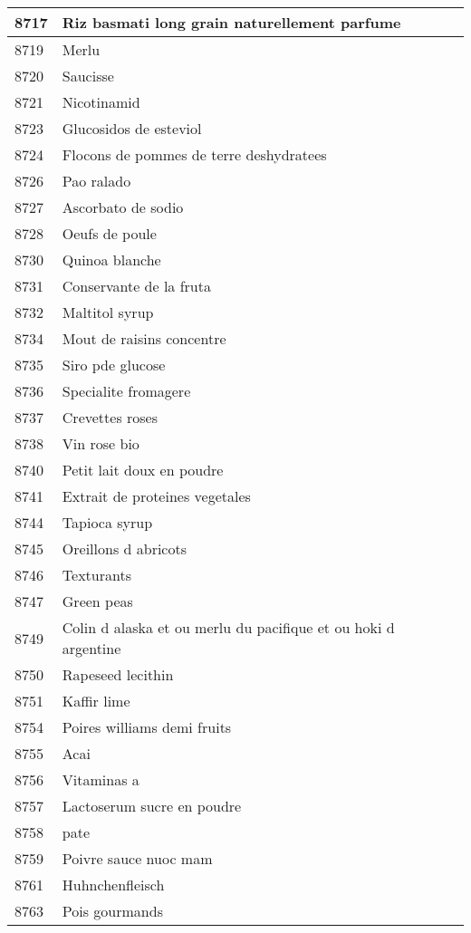 \begin{longtable}{|l|l|}
8717 & Riz basmati long grain naturellement parfume \\ \hline 
8719 & Merlu \\ \hline 
8720 & Saucisse \\ \hline 
8721 & Nicotinamid \\ \hline 
8723 & Glucosidos de esteviol \\ \hline 
8724 & Flocons de pommes de terre deshydratees \\ \hline 
8726 & Pao ralado \\ \hline 
8727 & Ascorbato de sodio \\ \hline 
8728 & Oeufs de poule \\ \hline 
8730 & Quinoa blanche \\ \hline 
8731 & Conservante de la fruta \\ \hline 
8732 & Maltitol syrup \\ \hline 
8734 & Mout de raisins concentre \\ \hline 
8735 & Siro pde glucose \\ \hline 
8736 & Specialite fromagere \\ \hline 
8737 & Crevettes roses \\ \hline 
8738 & Vin rose bio \\ \hline 
8740 & Petit lait doux en poudre \\ \hline 
8741 & Extrait de proteines vegetales \\ \hline 
8744 & Tapioca syrup \\ \hline 
8745 & Oreillons d abricots \\ \hline 
8746 & Texturants \\ \hline 
8747 & Green peas \\ \hline 
8749 & Colin d alaska et ou merlu du pacifique et ou hoki d argentine \\ \hline 
8750 & Rapeseed lecithin \\ \hline 
8751 & Kaffir lime \\ \hline 
8754 & Poires williams demi fruits \\ \hline 
8755 & Acai \\ \hline 
8756 & Vitaminas a \\ \hline 
8757 & Lactoserum sucre en poudre \\ \hline 
8758 & pate \\ \hline 
8759 & Poivre sauce nuoc mam \\ \hline 
8761 & Huhnchenfleisch \\ \hline 
8763 & Pois gourmands \\ \hline 

\end{longtable}
